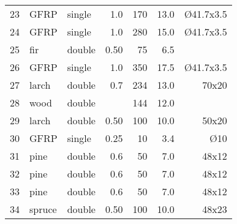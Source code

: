 {{{\begin{tabularx}{\textwidth}{@{}lXl rrrr@{}}
					23 & GFRP & single & 1.0 & 170 & 13.0 & \O 41.7x3.5\\
					24 & GFRP & single & 1.0 & 280 & 15.0 & \O 41.7x3.5\\
					25 & fir & double & 0.50 & 75 & 6.5 & \\
					26 & GFRP & single & 1.0 & 350 & 17.5 & \O 41.7x3.5\\
					27 & larch & double & 0.7 & 234 & 13.0 & 70x20\\
					28 & wood & double &  & 144 & 12.0 & \\
					29 & larch & double & 0.50 & 100 & 10.0 & 50x20\\
					30 & GFRP & single & 0.25 & 10 & 3.4 & \O 10\\
					31 & pine & double & 0.6 & 50 & 7.0 & 48x12\\
					32 & pine & double & 0.6 & 50 & 7.0 & 48x12\\
					33 & pine & double & 0.6 & 50 & 7.0 & 48x12\\
					34 & spruce & double & 0.50 & 100 & 10.0 & 48x23\\
					\bottomrule
				\end{tabularx}}
	}
}
